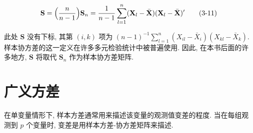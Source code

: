 \begin{mvbox}
\begin{center}
\end{center}
\label{eq:3-11}
\begin{equation}
\mathbf{S}=\Bigl(\frac{n}{n-1}\Bigr)\mathbf{S}_{n}=\frac{1}{n-1}\sum_{l=1}^{n}(\mathbf{X}_{l}-\bar{\mathbf{X}})(\mathbf{X}_{l}-\bar{\mathbf{X}})'
\tag{3-11}
\end{equation}
\end{mvbox}

此处 $\mathbf{S}$ 没有下标, 其第 $(i,k)$ 项为 $(n-1)^{-1}\sum_{l=1}^{n}(X_{il}-\bar{X}_{i})(X_{kl}-\bar{X}_{k})$. 样本协方差的这一定义在许多多元检验统计中被普遍使用. 因此, 在本书后面的许多地方, $\mathbf{S}$ 将取代 $\mathbf{S}_{n}$ 作为样本协方差矩阵.

\section{广义方差}
\label{sec:3.4}

在单变量情形下, 样本方差通常用来描述该变量的观测值变差的程度. 当在每组观测到 $p$ 个变量时, 变差是用样本方差-协方差矩阵来描述.
